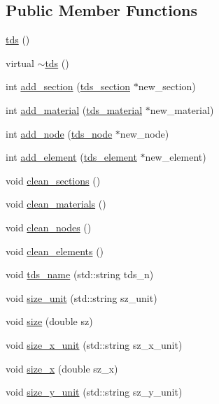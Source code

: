 \subsection*{Public Member Functions}
\begin{DoxyCompactItemize}
\item 
\hyperlink{classtds_a95c4027805a390a3031e9f52c08b89f0}{tds} ()
\item 
virtual \hyperlink{classtds_a192a8e8e17858b5408ba861b5dbfda82}{$\sim$tds} ()
\item 
int \hyperlink{classtds_abf92c8206a518017c40b9ab90eb5deb7}{add\-\_\-section} (\hyperlink{classtds__section}{tds\-\_\-section} $\ast$new\-\_\-section)
\item 
int \hyperlink{classtds_a105e3ea7b76d2da010923997324d1ec5}{add\-\_\-material} (\hyperlink{classtds__material}{tds\-\_\-material} $\ast$new\-\_\-material)
\item 
int \hyperlink{classtds_ab2be727bb6fb9ef9d880a62f5daabf32}{add\-\_\-node} (\hyperlink{classtds__node}{tds\-\_\-node} $\ast$new\-\_\-node)
\item 
int \hyperlink{classtds_aaf8d4e16284b4ac180b75828e2383ead}{add\-\_\-element} (\hyperlink{classtds__element}{tds\-\_\-element} $\ast$new\-\_\-element)
\item 
void \hyperlink{classtds_ad3be7939df63ea2147cb366504402950}{clean\-\_\-sections} ()
\item 
void \hyperlink{classtds_a9e124ba1f8612c881488915d4c7b1c5c}{clean\-\_\-materials} ()
\item 
void \hyperlink{classtds_ab225f20bb630a653f97de352c7f0fb99}{clean\-\_\-nodes} ()
\item 
void \hyperlink{classtds_a094622b47f168c579828e9c6743d5be7}{clean\-\_\-elements} ()
\item 
void \hyperlink{classtds_a4360dd60cf389359a50440d00d21b41f}{tds\-\_\-name} (std\-::string tds\-\_\-n)
\item 
void \hyperlink{classtds_a0ef1c70e8139e2f59d0234679e630346}{size\-\_\-unit} (std\-::string sz\-\_\-unit)
\item 
void \hyperlink{classtds_a409d0e3f35ba795307398c6ff60f2fc9}{size} (double sz)
\item 
void \hyperlink{classtds_a07deb94fcc9d489bfcdfbe7af2675fa4}{size\-\_\-x\-\_\-unit} (std\-::string sz\-\_\-x\-\_\-unit)
\item 
void \hyperlink{classtds_ab2982b1b1094353ceb63256ddc65de81}{size\-\_\-x} (double sz\-\_\-x)
\item 
void \hyperlink{classtds_a7824c39a088be0ba8c2c2fc95f292bf5}{size\-\_\-y\-\_\-unit} (std\-::string sz\-\_\-y\-\_\-unit)

\end{DoxyCompactItemize}
